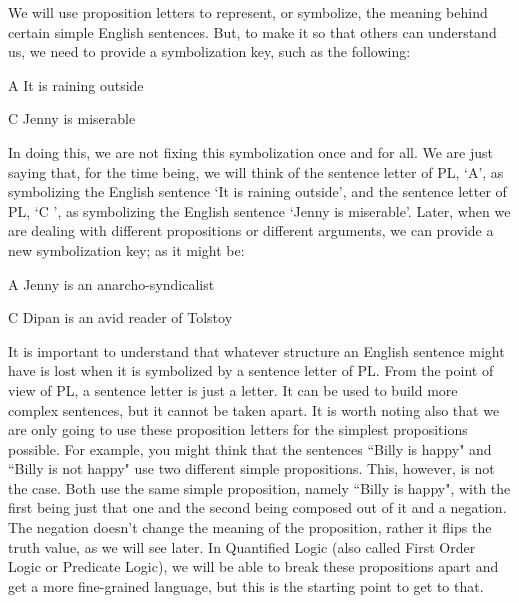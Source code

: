 We will use proposition letters to represent, or symbolize, the meaning behind certain simple English sentences. But, to make it so that others can understand us, we need to provide a \gls{symbolization key}, such as the following:
\begin{ekey}
\item[A] It is raining outside
\item[C] Jenny is miserable
\end{ekey}
In doing this, we are not fixing this symbolization once and for all. We are just saying that, for the time being, we will think of the sentence letter of PL, ‘A’, as symbolizing the English sentence ‘It is raining outside’, and the sentence letter of PL, ‘C ’, as symbolizing the English sentence ‘Jenny is miserable’. Later, when we are dealing with different propositions or different arguments, we can provide a new symbolization key; as it might be:
\begin{earg}
\item[A] Jenny is an anarcho-syndicalist
\item[C] Dipan is an avid reader of Tolstoy
\end{earg}
It is important to understand that whatever structure an English sentence might have is lost when it is symbolized by a sentence letter of PL. From the point of view of PL, a sentence letter is just a letter. It can be used to build more complex sentences, but it cannot be taken apart. It is worth noting also that we are only going to use these proposition letters for the simplest propositions possible. For example, you might think that the sentences “Billy is happy" and “Billy is not happy" use two different simple propositions. This, however, is not the case. Both use the same simple proposition, namely “Billy is happy", with the first being just that one and the second being composed out of it and a negation. The negation doesn't change the meaning of the proposition, rather it flips the truth value, as we will see later. In Quantified Logic (also called First Order Logic or Predicate Logic), we will be able to break these propositions apart and get a more fine-grained language, but this is the starting point to get to that.

